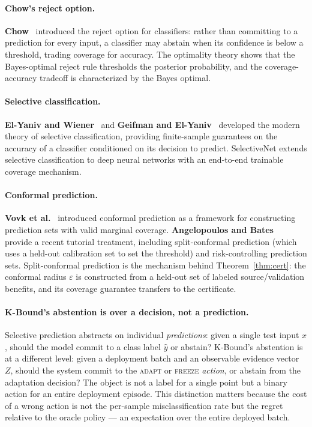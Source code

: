 \paragraph{Chow's reject option.}
\textbf{Chow}~\cite{chow1970optimum} introduced the reject option for
classifiers: rather than committing to a prediction for every input, a
classifier may abstain when its confidence is below a threshold, trading
coverage for accuracy.
The optimality theory shows that the Bayes-optimal reject rule thresholds the
posterior probability, and the coverage-accuracy tradeoff is characterized by
the Bayes optimal.

\paragraph{Selective classification.}
\textbf{El-Yaniv and Wiener}~\cite{elyaniv2010selective} and
\textbf{Geifman and El-Yaniv}~\cite{geifman2017selective} developed the
modern theory of selective classification, providing finite-sample guarantees
on the accuracy of a classifier conditioned on its decision to predict.
SelectiveNet extends selective classification to deep neural networks with
an end-to-end trainable coverage mechanism.

\paragraph{Conformal prediction.}
\textbf{Vovk et al.}~\cite{vovk2005algorithmic} introduced conformal
prediction as a framework for constructing prediction sets with valid marginal
coverage.
\textbf{Angelopoulos and Bates}~\cite{angelopoulos2023conformal} provide a
recent tutorial treatment, including split-conformal prediction (which
uses a held-out calibration set to set the threshold) and risk-controlling
prediction sets.
Split-conformal prediction is the mechanism behind Theorem~\ref{thm:cert}:
the conformal radius $\varepsilon$ is constructed from a held-out set of
labeled source/validation benefits, and its coverage guarantee transfers to
the certificate.

\paragraph{K-Bound's abstention is over a decision, not a prediction.}
Selective prediction abstracts on individual \emph{predictions}: given a single
test input $x$, should the model commit to a class label $\hat{y}$ or abstain?
K-Bound's abstention is at a different level: given a deployment batch and an
observable evidence vector $Z$, should the system commit to the
\textsc{adapt} or \textsc{freeze} \emph{action}, or abstain from the
adaptation decision?
The object is not a label for a single point but a binary action for an entire
deployment episode.
This distinction matters because the cost of a wrong action is not the
per-sample misclassification rate but the regret relative to the oracle
policy --- an expectation over the entire deployed batch.

